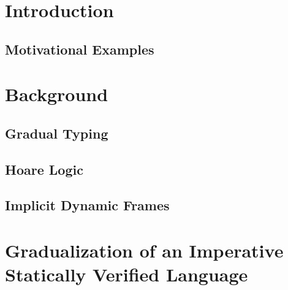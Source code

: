 
\chapter{Introduction}
\label{ch:introduction}


    \section{Motivational Examples}
    \label{sec:motivationexamples}
    



\chapter{Background}
\label{sec:categorization-of-existing}


\section{Gradual Typing}
\label{ssec:abstracting-gradual-typing}


\section{Hoare Logic}
\label{sec:hoare-logic}


\section{Implicit Dynamic Frames}
\label{ssec:implicit-dynamic-frames}





\chapter{Gradualization of an Imperative Statically Verified Language}
\label{ch:gradualization-of-a}


